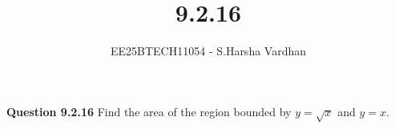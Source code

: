 \documentclass[journal]{IEEEtran}
\begin{document}


\title{9.2.16}
\author{EE25BTECH11054 - S.Harsha Vardhan}
\maketitle 
\renewcommand{\thefigure}{\theenumi}
\renewcommand{\thetable}{\theenumi}
\setlength{\intextsep}{10pt} %

\renewcommand{\thetable}{\theenumi}
\vspace{-1em}

\textbf{Question 9.2.16}
Find the area of the region bounded by $y = \sqrt{x}$ and $y = x$.
\end{document}
